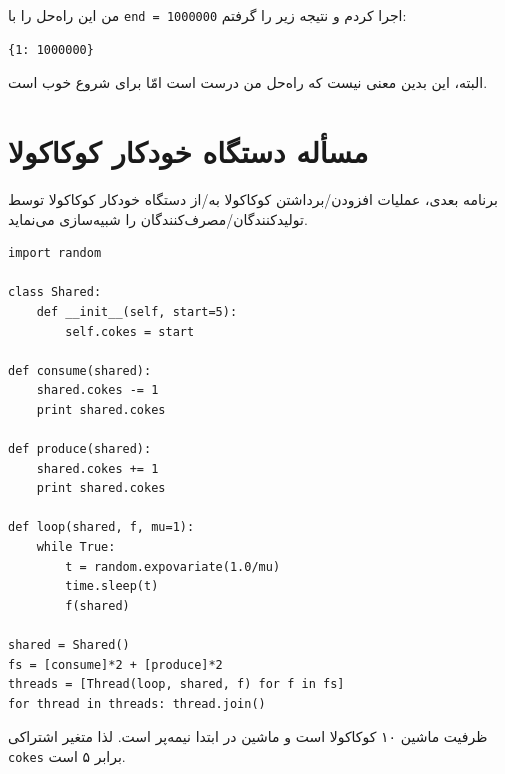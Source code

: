 \documentclass{book}
\newcommand{\clearemptydoublepage}{\newpage\cleardoublepage}
\begin{document}
    من این راه‌حل را با  {\tt end = 1000000} اجرا کردم و نتیجه زیر را گرفتم: 
\begin{latin}
\begin{verbatim}
{1: 1000000}
\end{verbatim}
\end{latin}

    البته، این بدین معنی نیست که راه‌حل من درست است امّا برای شروع خوب است. 
    


\clearemptydoublepage
\section {مسأله دستگاه خودکار کوکاکولا}

    برنامه بعدی، عملیات افزودن/برداشتن  کوکاکولا به/از دستگاه خودکار کوکاکولا توسط تولیدکنندگان/مصرف‌کنندگان را شبیه‌سازی می‌نماید. 

\begin{latin}
\begin{lstlisting}
import random

class Shared:
    def __init__(self, start=5):
        self.cokes = start

def consume(shared):
    shared.cokes -= 1
    print shared.cokes

def produce(shared):
    shared.cokes += 1
    print shared.cokes

def loop(shared, f, mu=1):
    while True:
        t = random.expovariate(1.0/mu)
        time.sleep(t)
        f(shared)

shared = Shared()
fs = [consume]*2 + [produce]*2 
threads = [Thread(loop, shared, f) for f in fs]
for thread in threads: thread.join()
\end{lstlisting}
\end{latin}

    ظرفیت ماشین ۱۰ کوکاکولا است و ماشین در ابتدا نیمه‌پر است. لذا متغیر اشتراکی {\tt cokes} برابر ۵ است. 
\end{document}
